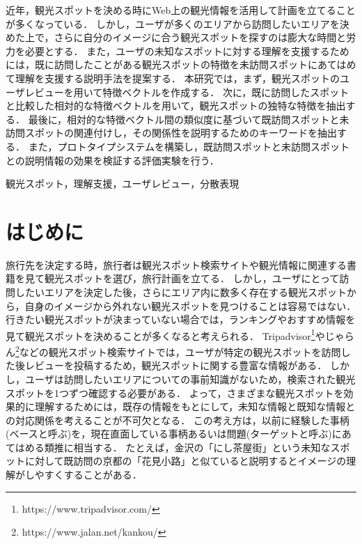 \documentclass{deimj}
\begin{document}
\pagestyle{empty}
\begin{jabstract}
近年，観光スポットを決める時にWeb上の観光情報を活用して計画を立てることが多くなっている．
しかし，ユーザが多くのエリアから訪問したいエリアを決めた上で，さらに自分のイメージに合う観光スポットを探すのは膨大な時間と労力を必要とする．
また，ユーザの未知なスポットに対する理解を支援するためには，既に訪問したことがある観光スポットの特徴を未訪問スポットにあてはめて理解を支援する説明手法を提案する．
本研究では，まず，観光スポットのユーザレビューを用いて特徴ベクトルを作成する．
次に，既に訪問したスポットと比較した相対的な特徴ベクトルを用いて，観光スポットの独特な特徴を抽出する．
最後に，相対的な特徴ベクトル間の類似度に基づいて既訪問スポットと未訪問スポットの関連付けし，その関係性を説明するためのキーワードを抽出する．
また，プロトタイプシステムを構築し，既訪問スポットと未訪問スポットとの説明情報の効果を検証する評価実験を行う．
\end{jabstract}

\begin{jkeyword}
観光スポット，理解支援，ユーザレビュー，分散表現
\end{jkeyword}
\maketitle

\section{はじめに}
\label{sec:はじめに}
旅行先を決定する時，旅行者は観光スポット検索サイトや観光情報に関連する書籍を見て観光スポットを選び，旅行計画を立てる．
しかし，ユーザにとって訪問したいエリアを決定した後，さらにエリア内に数多く存在する観光スポットから，自身のイメージから外れない観光スポットを見つけることは容易ではない．
行きたい観光スポットが決まっていない場合では，ランキングやおすすめ情報を見て観光スポットを決めることが多くなると考えられる．
Tripadvisor\footnote{https://www.tripadvisor.com/}やじゃらん\footnote{https://www.jalan.net/kankou/}などの観光スポット検索サイトでは，ユーザが特定の観光スポットを訪問した後レビューを投稿するため，観光スポットに関する豊富な情報がある．
しかし，ユーザは訪問したいエリアについての事前知識がないため，検索された観光スポットを1つずつ確認する必要がある．
よって，さまざまな観光スポットを効果的に理解するためには，既存の情報をもとにして，未知な情報と既知な情報との対応関係を考えることが不可欠となる．
この考え方は，以前に経験した事柄(ベースと呼ぶ)を，現在直面している事柄あるいは問題(ターゲットと呼ぶ)にあてはめる類推に相当する．
たとえば，金沢の「にし茶屋街」という未知なスポットに対して既訪問の京都の「花見小路」と似ていると説明するとイメージの理解がしやすくすることがある．
\end{document}
